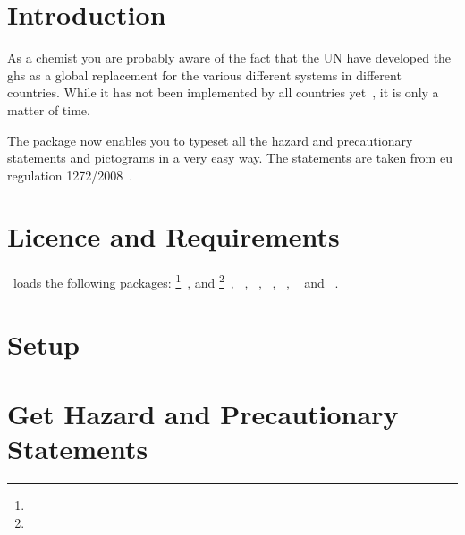 \documentclass[load-preamble+]{cnltx-doc}
\begin{document}
\section{Introduction}
As a chemist you are probably aware of the fact that the \acl{UN} have
developed the \ac{ghs} as a global replacement for the various different
systems in different countries.  While it has not been implemented by all
countries yet~\cite{unece:ghsystem_implementation}, it is only a matter of
time.

The package \ghsystem{} now enables you to typeset all the hazard and
precautionary statements and pictograms in a very easy way.  The statements
are taken from \acs{eu} regulation 1272/2008~\cite{eu:ghsystem_regulation}.

\section{Licence and Requirements}
\license

\ghsystem\ loads the following packages:
\footnote{}~\cite{bnd:l3kernel},  and
\footnote{}~\cite{bnd:l3packages},
~\cite{pkg:translations},
~\cite{pkg:translations},
~\cite{pkg:siunitx},
~\cite{pkg:graphicx},
~\cite{pkg:longtable} and
~\cite{pkg:ifpdf}.

\section{Setup}

\section{Get Hazard and Precautionary Statements}
\end{document}
